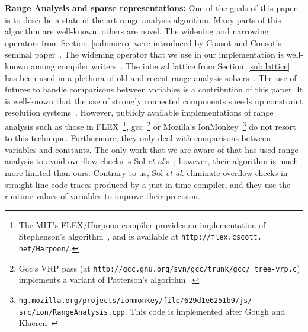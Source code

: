 \documentclass{sigplanconf}[10pt]
\begin{document}
\noindent
\textbf{Range Analysis and sparse representations:}
One of the goals of this paper is to describe a state-of-the-art range analysis
algorithm.
Many parts of this algorithm are well-known, others are novel.
The widening and narrowing operators from Section~\ref{sub:micro} were
introduced by Cousot and Cousot's seminal paper~\cite{Cousot77}.
The widening operator that we use in our implementation is well-known among
compiler writers~\cite[p.228]{Nielson99}.
The interval lattice from Section~\ref{sub:lattice} has been used in a
plethora of old and recent range analysis
solvers~\cite{Gough94,Gawlitza09,Logozzo10,Mahlke01,Oh12,Patterson95,Stephenson00,Su05}.
The use of futures to handle comparisons between variables is a contribution
of this paper.
It is well-known that the use of strongly connected components speeds up
constraint resolution systems~\cite[Sec 6.3]{Nielson99}.
However, publicly available implementations of range analysis such as those in
FLEX~\footnote{The MIT's FLEX/Harpoon compiler
provides an implementation of Stephenson's algorithm~\cite{Stephenson00}, and
is available at \texttt{http://flex.cscott. net/Harpoon/}.},
gcc~\footnote{Gcc's VRP pass (at \texttt{http://gcc.gnu.org/svn/gcc/trunk/gcc/
tree-vrp.c}) implements a variant of Patterson's
algorithm~\cite{Patterson95}.} or Mozilla's IonMonkey~\footnote{\texttt{hg.mozilla.org/projects/ionmonkey/file/629d1e6251b9/js/
src/ion/RangeAnalysis.cpp}. This code is implemented after Gough and
Klaeren~\cite{Gough94}} do not resort to this technique.
Furthermore, they only deal with comparisons between variables and constants.
The only work that we are aware of that has used range analysis to avoid
overflow checks is Sol {\em et al}'s~\cite{Sol11}; however, their algorithm
is much more limited than ours.
Contrary to us, Sol {\em et al.} eliminate overflow checks in
straight-line code traces produced by a just-in-time compiler, and they use the
runtime values of variables to improve their precision.
\end{document}
